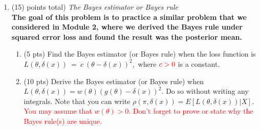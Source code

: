 \documentclass{article}
\begin{document}
\begin{enumerate}
  
  
\item (15)  points total) {\em The Bayes estimator or Bayes rule} \\
\textbf{The goal of this problem is to practice a similar problem that we considered in Module 2, where we derived the Bayes rule under squared error loss and found the result was the posterior mean.}\\
\begin{enumerate}
\item (5 pts) Find the Bayes estimator (or Bayes rule) when the loss function is  $L(\theta, \delta(x))~=~c~(\theta-\delta(x))^2,$ where $\textcolor{red}{c >0}$ is a constant. 
\item (10 pts) Derive the Bayes estimator (or Bayes rule) when $L(\theta, \delta(x)) = w(\theta) (g(\theta)-\delta(x))^2.$ Do so without writing any integrals. Note that you can write $\rho(\pi,\delta(x)) =  E[L(\theta,\delta(x))|X].$  \textcolor{red}{You may assume that $w(\theta) > 0.$} \textcolor{red}{Don't forget to prove or state why the Bayes rule(s) are unique.}
\end{enumerate}

%


\end{enumerate}
\end{document}
